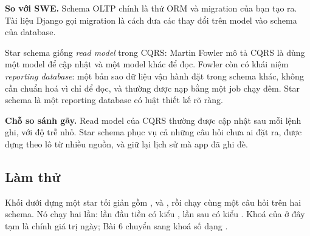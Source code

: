 \begin{ghichu}
\textbf{So với SWE.} Schema OLTP chính là thứ ORM và migration của bạn tạo ra. Tài liệu Django gọi migration là cách đưa các thay đổi trên model vào schema của database.

Star schema giống \textit{read model} trong CQRS: Martin Fowler mô tả CQRS là dùng một model để cập nhật và một model khác để đọc. Fowler còn có khái niệm \textit{reporting database}: một bản sao dữ liệu vận hành đặt trong schema khác, không cần chuẩn hoá vì chỉ để đọc, và thường được nạp bằng một job chạy đêm. Star schema là một reporting database có luật thiết kế rõ ràng.

\textbf{Chỗ so sánh gãy.} Read model của CQRS thường được cập nhật sau mỗi lệnh ghi, với độ trễ nhỏ. Star schema phục vụ cả những câu hỏi chưa ai đặt ra, được dựng theo lô từ nhiều nguồn, và giữ lại lịch sử mà app đã ghi đè.
\end{ghichu}

\subsection{Làm thử}

Khối dưới dựng một star tối giản gồm ,  và , rồi chạy cùng một câu hỏi trên hai schema. Nó chạy hai lần: lần đầu tiền có kiểu , lần sau có kiểu . Khoá của  ở đây tạm là chính giá trị ngày; Bài 6 chuyển sang khoá số dạng .

